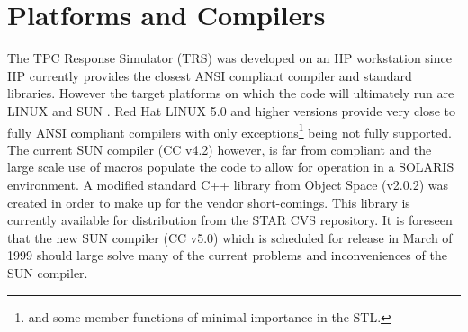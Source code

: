 \documentclass[twoside]{article}
\newcommand{\name}[1]{\textsf{#1}}%
\begin{document}
\section{Platforms and Compilers}  
\label{platformsAndCompilers}

The \name{TPC Response Simulator} (\name{TRS}) was developed on
an HP  workstation since HP currently provides the
closest ANSI  compliant compiler and standard libraries.  However
the target platforms on which the code will ultimately
run are LINUX  and SUN .  Red Hat LINUX 5.0
and higher versions provide very close to fully ANSI compliant compilers
with only exceptions\footnote{and some member functions of minimal
  importance in the STL.}
being not fully
supported.  The current SUN compiler (CC v4.2) however,
is far from compliant and the large scale use of macros populate
the code to allow for operation in a SOLARIS  
environment.  A modified standard C++ library from Object 
Space  (v2.0.2) was created in order to make up for
the vendor short-comings.  This library is currently available
for distribution from the STAR CVS  repository.  
It is foreseen that the
new SUN compiler (CC v5.0) which is scheduled for release in
March of 1999 should large solve many of the current problems
and inconveniences of the SUN compiler.
\end{document}

